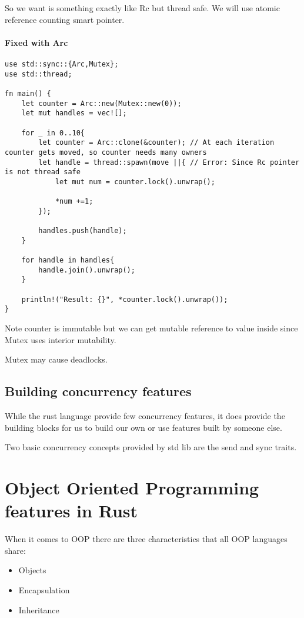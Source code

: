 So we want is something exactly like Rc but thread safe. We will use atomic reference counting smart pointer.
\paragraph*{Fixed with Arc}\begin{lstlisting}
use std::sync::{Arc,Mutex};
use std::thread;

fn main() {
    let counter = Arc::new(Mutex::new(0));
    let mut handles = vec![];

    for _ in 0..10{
        let counter = Arc::clone(&counter); // At each iteration counter gets moved, so counter needs many owners
        let handle = thread::spawn(move ||{ // Error: Since Rc pointer is not thread safe
            let mut num = counter.lock().unwrap();

            *num +=1;
        });

        handles.push(handle);
    }

    for handle in handles{
        handle.join().unwrap();
    }

    println!("Result: {}", *counter.lock().unwrap());
}
\end{lstlisting}
Note counter is immutable but we can get mutable reference to value inside since Mutex uses interior mutability.

\begin{remark}
    Mutex may cause deadlocks.
\end{remark}

\subsection{Building concurrency features}

While the rust language provide few concurrency features, it does provide the building blocks for us to build our own or use features built by someone else.

Two basic concurrency concepts provided by std lib are the send and sync traits.

\section{Object Oriented Programming features in Rust}
When it comes to OOP there are three characteristics that all OOP languages share:\begin{itemize}
    \item Objects
    \item Encapsulation
    \item Inheritance
\end{itemize}

